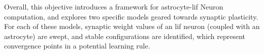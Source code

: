 Overall, this objective introduces a framework for astrocyte-\gls{lif} Neuron
computation, and explores two specific models geared towards synaptic
plasticity. For each of these models, synaptic weight values of an \gls{lif} neuron
(coupled with an astrocyte) are swept, and stable configurations are identified,
which represent convergence points in a potential learning rule.





